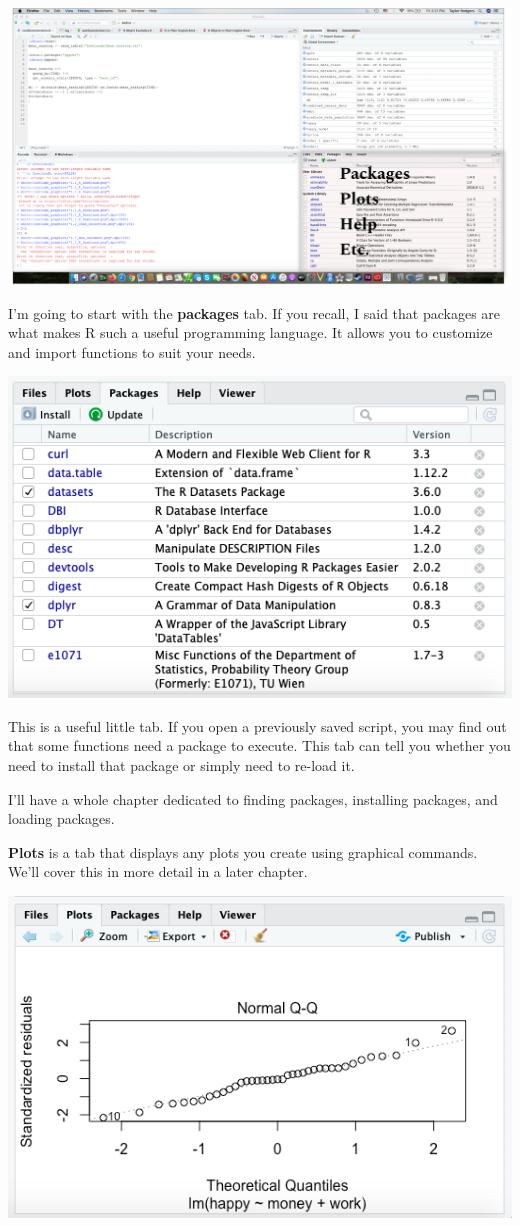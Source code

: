 \documentclass[
]{book}
\begin{document}
\begin{center}\includegraphics[width=0.75\linewidth]{1.23_RStudio_PackagesEtc} \end{center}

I'm going to start with the \textbf{packages} tab. If you recall, I said that packages are what makes R such a useful programming language. It allows you to customize and import functions to suit your needs.

\begin{center}\includegraphics[width=0.75\linewidth]{1.24_Packages} \end{center}

This is a useful little tab. If you open a previously saved script, you may find out that some functions need a package to execute. This tab can tell you whether you need to install that package or simply need to re-load it.

I'll have a whole chapter dedicated to finding packages, installing packages, and loading packages.

\textbf{Plots} is a tab that displays any plots you create using graphical commands. We'll cover this in more detail in a later chapter.

\begin{center}\includegraphics[width=0.75\linewidth]{1.25_Plots} \end{center}
\end{document}
